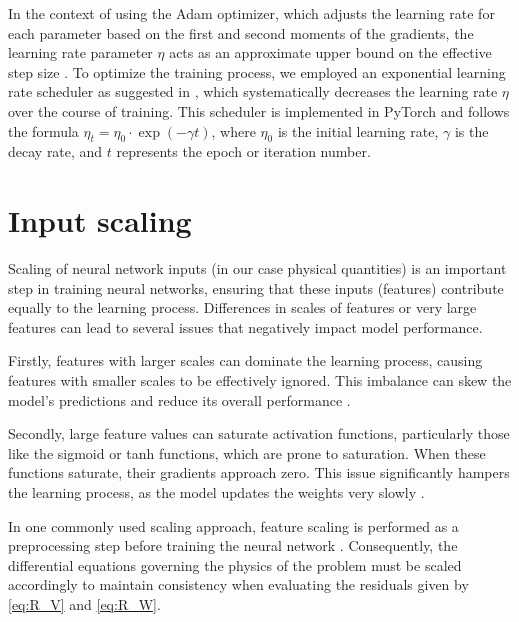 In the context of using the Adam optimizer, which adjusts the learning rate for each parameter based on the first and second moments of the gradients, the learning rate parameter $\eta$ acts as an approximate upper bound on the effective step size \cite{adam}. To optimize the training process, we employed an exponential learning rate scheduler as suggested in \cite{experts}, which systematically decreases the learning rate $\eta$ over the course of training. This scheduler is implemented in PyTorch and follows the formula $\eta_t = \eta_0 \cdot \exp(-\gamma t)$, where $\eta_0$ is the initial learning rate, $\gamma$ is the decay rate, and $t$ represents the epoch or iteration number.



\section{Input scaling}\label{scaling}
Scaling of neural network inputs (in our case physical quantities) is an important step in training neural networks, ensuring that these inputs (features) contribute equally to the learning process. Differences in scales of features or very large features can lead to several issues that negatively impact model performance.

Firstly, features with larger scales can dominate the learning process, causing features with smaller scales to be effectively ignored. This imbalance can skew the model's predictions and reduce its overall performance \cite{Goodfellow}. 

Secondly, large feature values can saturate activation functions, particularly those like the sigmoid or tanh functions, which are prone to saturation. When these functions saturate, their gradients approach zero. This issue significantly hampers the learning process, as the model updates the weights very slowly \cite{glorot}.



In one commonly used scaling approach, feature scaling is performed as a preprocessing step before training the neural network \cite{experts}. Consequently, the differential equations governing the physics of the problem must be scaled accordingly to maintain consistency when evaluating the residuals given by \eqref{eq:R_V} and \eqref{eq:R_W}.

